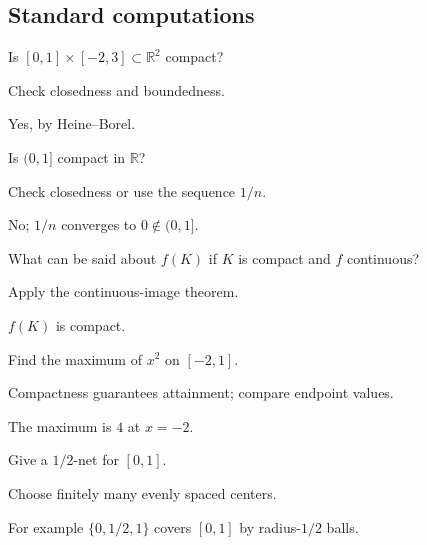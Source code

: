 \subsection*{Standard computations}

\begin{exercise}\label{exr:ii06-expand-01}
Is \([0,1]\times[-2,3]\subset\mathbb R^2\) compact?
\end{exercise}
\begin{hint}
Check closedness and boundedness.
\end{hint}
\begin{solution}
Yes, by Heine--Borel.
\end{solution}

\begin{exercise}\label{exr:ii06-expand-02}
Is \((0,1]\) compact in \(\mathbb R\)?
\end{exercise}
\begin{hint}
Check closedness or use the sequence \(1/n\).
\end{hint}
\begin{solution}
No; \(1/n\) converges to \(0\notin(0,1]\).
\end{solution}

\begin{exercise}\label{exr:ii06-expand-03}
What can be said about \(f(K)\) if \(K\) is compact and \(f\) continuous?
\end{exercise}
\begin{hint}
Apply the continuous-image theorem.
\end{hint}
\begin{solution}
\(f(K)\) is compact.
\end{solution}

\begin{exercise}\label{exr:ii06-expand-04}
Find the maximum of \(x^2\) on \([-2,1]\).
\end{exercise}
\begin{hint}
Compactness guarantees attainment; compare endpoint values.
\end{hint}
\begin{solution}
The maximum is \(4\) at \(x=-2\).
\end{solution}

\begin{exercise}\label{exr:ii06-expand-05}
Give a \(1/2\)-net for \([0,1]\).
\end{exercise}
\begin{hint}
Choose finitely many evenly spaced centers.
\end{hint}
\begin{solution}
For example \(\{0,1/2,1\}\) covers \([0,1]\) by radius-\(1/2\) balls.
\end{solution}

